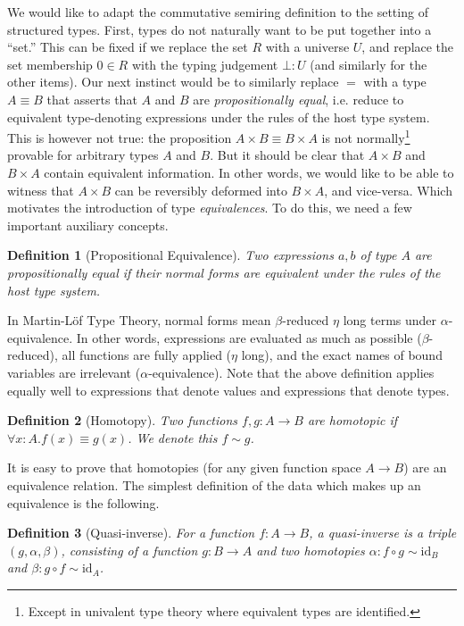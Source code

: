 \documentclass{article}
\newtheorem{defn}{Definition}[section]
\begin{document}
We would like to adapt the commutative semiring definition to the
setting of structured types. First, types do not naturally want to be
put together into a ``set.''  This can be fixed if we replace the set
$R$ with a universe $U$, and replace the set membership $0 \in R$ with
the typing judgement $\bot : U$ (and similarly for the other
items). Our next instinct would be to similarly replace $=$ with a
type $A \equiv B$ that asserts that $A$ and $B$ are \emph{propositionally
equal}, i.e. reduce to equivalent type-denoting expressions under the rules of
the host type system.  This is however not true: the
proposition $A \times B \equiv B \times A$ is not
normally\footnote{Except in univalent type theory where equivalent
types are identified.} provable for arbitrary types $A$ and $B$. But
it should be clear that $A \times B$ and $B \times A$ contain
equivalent information. In other words, we would like to be able to
witness that $A \times B$ can be reversibly deformed into $B \times
A$, and vice-versa. Which motivates the introduction of type \emph{equivalences}. To
do this, we need a few important auxiliary concepts.

\begin{defn}[Propositional Equivalence]\label{def:propeq}
Two expressions $a, b$ of type $A$ are \emph{propositionally
equal} if their normal forms are equivalent under the rules
of the host type system.
\end{defn}

In Martin-L\"{o}f Type Theory, normal forms mean $\beta$-reduced
$\eta$ long terms under $\alpha$-equivalence. In other words,
expressions are evaluated as much as possible ($\beta$-reduced),
all functions are fully applied ($\eta$ long), and the exact names
of bound variables are irrelevant ($\alpha$-equivalence). Note that
the above definition applies equally well to expressions that denote
values and expressions that denote types.

\begin{defn}[Homotopy]
\label{def:homotopy}
Two functions $f,g:A \rightarrow B$ are \emph{homotopic}
if~$\forall x:A. f(x) \equiv g(x)$. We denote this $f \sim g$.
\end{defn}

\noindent It is easy to prove that homotopies (for any given function
space $A \rightarrow B$) are an equivalence relation.  The simplest
definition of the data which makes up an equivalence is the following.

\begin{defn}[Quasi-inverse]
\label{def:quasi}
For a function $f : A \rightarrow B$, a \emph{quasi-inverse} is a
triple $(g, \alpha, \beta)$, consisting of a function
$g : B \rightarrow A$ and two homotopies
$\alpha : f \circ g \sim \mathrm{id}_B$ and
$\beta : g \circ f \sim \mathrm{id}_A$.
\end{defn}
\end{document}
